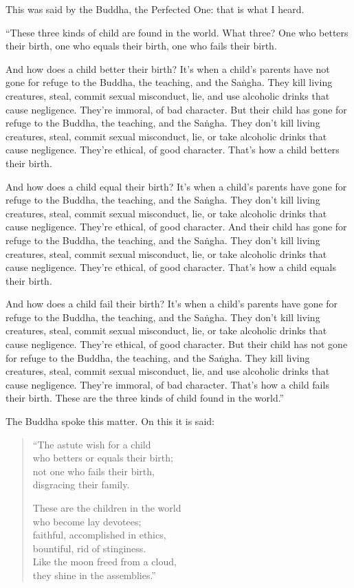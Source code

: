\documentclass[12pt,openany]{book}%
\begin{document}
This was said by the Buddha, the Perfected One: that is what I heard. 

“These three kinds of child are found in the world. What three? One who betters their birth, one who equals their birth, one who fails their birth. 

And how does a child better their birth? It’s when a child’s parents have not gone for refuge to the Buddha, the teaching, and the \textsanskrit{Saṅgha}. They kill living creatures, steal, commit sexual misconduct, lie, and use alcoholic drinks that cause negligence. They’re immoral, of bad character. But their child has gone for refuge to the Buddha, the teaching, and the \textsanskrit{Saṅgha}. They don’t kill living creatures, steal, commit sexual misconduct, lie, or take alcoholic drinks that cause negligence. They’re ethical, of good character. That’s how a child betters their birth. 

And how does a child equal their birth? It’s when a child’s parents have gone for refuge to the Buddha, the teaching, and the \textsanskrit{Saṅgha}. They don’t kill living creatures, steal, commit sexual misconduct, lie, or take alcoholic drinks that cause negligence. They’re ethical, of good character. And their child has gone for refuge to the Buddha, the teaching, and the \textsanskrit{Saṅgha}. They don’t kill living creatures, steal, commit sexual misconduct, lie, or take alcoholic drinks that cause negligence. They’re ethical, of good character. That’s how a child equals their birth. 

And how does a child fail their birth? It’s when a child’s parents have gone for refuge to the Buddha, the teaching, and the \textsanskrit{Saṅgha}. They don’t kill living creatures, steal, commit sexual misconduct, lie, or take alcoholic drinks that cause negligence. They’re ethical, of good character. But their child has not gone for refuge to the Buddha, the teaching, and the \textsanskrit{Saṅgha}. They kill living creatures, steal, commit sexual misconduct, lie, and use alcoholic drinks that cause negligence. They’re immoral, of bad character. That’s how a child fails their birth. These are the three kinds of child found in the world.” 

The Buddha spoke this matter. On this it is said: 

\begin{verse}%
“The astute wish for a child \\
who betters or equals their birth; \\
not one who fails their birth, \\
disgracing their family. 

These are the children in the world \\
who become lay devotees; \\
faithful, accomplished in ethics, \\
bountiful, rid of stinginess. \\
Like the moon freed from a cloud, \\
they shine in the assemblies.” 

%
\end{verse}
\end{document}
